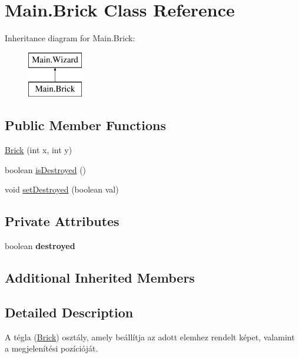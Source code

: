 \hypertarget{class_main_1_1_brick}{}\section{Main.\+Brick Class Reference}
\label{class_main_1_1_brick}
Inheritance diagram for Main.\+Brick\+:\begin{figure}[H]
\begin{center}
\leavevmode
\includegraphics[height=2.000000cm]{class_main_1_1_brick}
\end{center}
\end{figure}
\subsection*{Public Member Functions}
\begin{DoxyCompactItemize}
\item 
\hyperlink{class_main_1_1_brick_a82323322bc85cd2c25936ff7b7fa24c4}{Brick} (int x, int y)
\item 
boolean \hyperlink{class_main_1_1_brick_a0db489a431d39848dbe5bf1a29806d5b}{is\+Destroyed} ()
\item 
void \hyperlink{class_main_1_1_brick_a3308c5fb485ad1c1f2d85bf1fc00d828}{set\+Destroyed} (boolean val)
\end{DoxyCompactItemize}
\subsection*{Private Attributes}
\begin{DoxyCompactItemize}
\item 
boolean {\bfseries destroyed}\hypertarget{class_main_1_1_brick_a0d8384d31b5a1db89e115dfc2517b143}{}\label{class_main_1_1_brick_a0d8384d31b5a1db89e115dfc2517b143}

\end{DoxyCompactItemize}
\subsection*{Additional Inherited Members}


\subsection{Detailed Description}
A tégla (\hyperlink{class_main_1_1_brick}{Brick}) osztály, amely beállítja az adott elemhez rendelt képet, valamint a megjelenítési pozícióját. 

